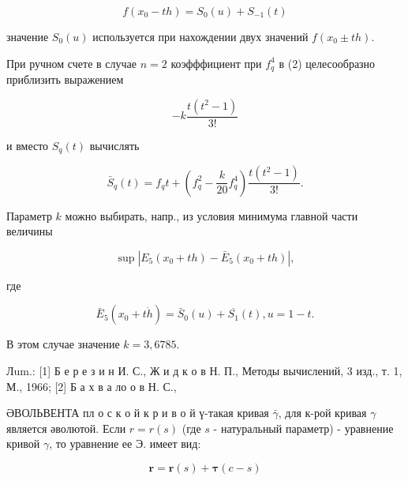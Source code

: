 \documentclass[10pt]{article}
\begin{document}
\[

f\left(x_{0}-t h\right)=S_{0}(u)+S_{-1}(t)

\]



значение $S_{0}(u)$ используется при нахождении двух значений $f\left(x_{0} \pm t h\right)$.



При ручном счете в случае $n=2$ коэфффициент при $f_{q}^{4}$ в (2) целесообразно приблизить выражением



\[

-k \frac{t\left(t^{2}-1\right)}{3 !}

\]



и вместо $S_{q}(t)$ вычислять



\[

\bar{S}_{q}(t)=f_{q} t+\left(f_{q}^{2}-\frac{k}{20} f_{q}^{4}\right) \frac{t\left(t^{2}-1\right)}{3 !} .

\]



Параметр $k$ можно выбирать, напр., из условия минимума главной части величины



\[

\sup \left|E_{5}\left(x_{0}+t h\right)-\bar{E}_{5}\left(x_{0}+t h\right)\right|,

\]



где



\[

\bar{E}_{5}\left(x_{0}+t \dot{h}\right)=\bar{S}_{0}(u)+\overline{S_{1}}(t), u=1-t .

\]



В этом случае значение $k=3,6785$.



Лum.: [1] Б е р е з и н И. С., Ж и д к о в Н. П., Методы вычислений, 3 изд., т. 1, М., 1966; [2] Б а х в а ло о в Н. С.,



ӘВОЛЬВЕНТА пл о с к о й к р и в о й $ү$-такая кривая $\bar{\gamma}$, для к-рой кривая $\gamma$ является әволютой. Если $r=r(s)$ (где $s$ - натуральный параметр) - уравнение кривой $\gamma$, то уравнение ее $Э$. имеет вид:



\[

\boldsymbol{r}=\boldsymbol{r}(s)+\boldsymbol{\tau}(c-s)

\]
\end{document}
